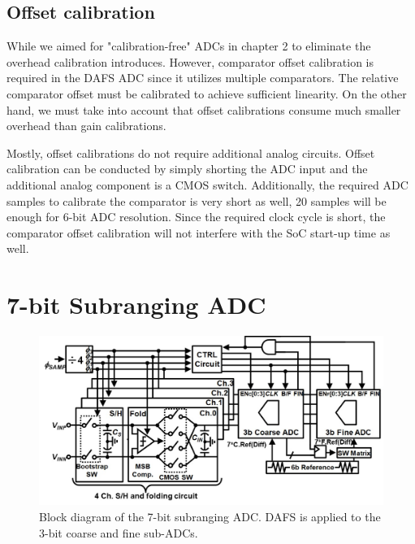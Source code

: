 \subsection{Offset calibration}
While we aimed for "calibration-free" ADCs in chapter 2 to eliminate the overhead calibration introduces. However, comparator offset calibration is required in the DAFS ADC since it utilizes multiple comparators.
The relative comparator offset must be calibrated to achieve sufficient linearity.
On the other hand, we must take into account that offset calibrations consume much smaller overhead than gain calibrations.

Mostly, offset calibrations do not require additional analog circuits. 
Offset calibration can be conducted by simply shorting the ADC input and the additional analog component is a CMOS switch.
Additionally, the required ADC samples to calibrate the comparator is very short as well, 20 samples will be enough for 6-bit ADC resolution.
Since the required clock cycle is short, the comparator offset calibration will not interfere with the SoC start-up time as well.

\section{7-bit Subranging ADC} \label{chap3-sec3}

\begin{figure}
\centering
  \includegraphics[width=1\textwidth]{figure/chap3/fig7.jpg}
  \caption{Block diagram of the 7-bit subranging ADC. DAFS is applied to the 3-bit coarse and fine sub-ADCs.}
  \label{fig-3-7}
\end{figure}

